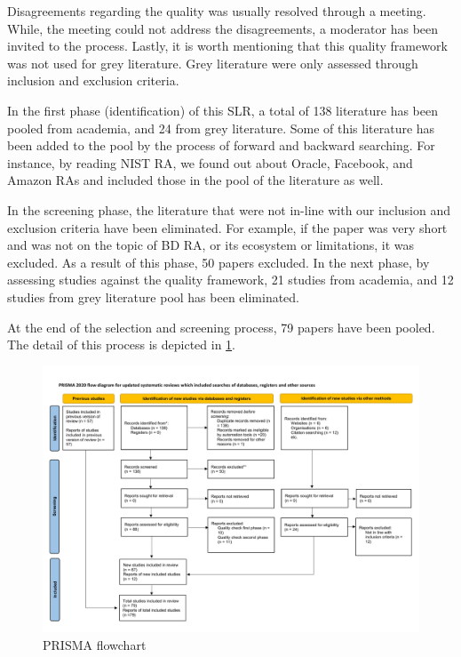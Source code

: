 \documentclass[review]{elsarticle}
\begin{document}
Disagreements regarding the quality was usually resolved through a meeting. While, the meeting could not address the disagreements, a moderator has been invited to the process. Lastly, it is worth mentioning that this quality framework was not used for grey literature. Grey literature were only assessed through inclusion and exclusion criteria. 

In the first phase (identification) of this SLR, a total of 138 literature has been pooled from academia, and 24 from grey literature. Some of this literature has been added to the pool by the process of forward and backward searching. For instance, by reading NIST RA, we found out about Oracle, Facebook, and Amazon RAs and included those in the pool of the literature as well. 

In the screening phase, the literature that were not in-line with our inclusion and exclusion criteria have been eliminated. For example, if the paper was very short and was not on the topic of BD RA, or its ecosystem or limitations, it was excluded. As a result of this phase, 50 papers excluded. In the next phase, by assessing studies against the quality framework, 21 studies from academia, and 12 studies from grey literature pool has been eliminated. 

At the end of the selection and screening process, 79 papers have been pooled. The detail of this process is depicted in \ref{fig:PRISMA}.

\begin{figure}[t]
    \includegraphics[width=13cm]{PRISMA/PRISMA_Flow_Diagram.pdf}
    \caption{PRISMA flowchart}
    \label{fig:PRISMA}
\end{figure}
\end{document}
